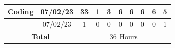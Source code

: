 \documentclass[12pt]{report}
\begin{document}
\begin{table}[h]
{\begin{tabular}{|cc|cccccccc|}
\multicolumn{1}{|c|}{\cellcolor[HTML]{FFFFFF}\textbf{Coding}}                                                    & 07/02/23                                                           & \multicolumn{1}{c|}{\cellcolor[HTML]{FFFFFF}33}                                                                   & \multicolumn{1}{c|}{\cellcolor[HTML]{FFFFFF}1}                                                                 & \multicolumn{1}{c|}{\cellcolor[HTML]{FFFFFF}3}                                                                 & \multicolumn{1}{c|}{\cellcolor[HTML]{FFFFFF}6}                                                                 & \multicolumn{1}{c|}{\cellcolor[HTML]{FFFFFF}6}                                                                 & \multicolumn{1}{c|}{\cellcolor[HTML]{FFFFFF}6}                                                                 & \multicolumn{1}{c|}{\cellcolor[HTML]{FFFFFF}6}                                                                 & \cellcolor[HTML]{FFFFFF}5                                         \\ \hline
\rowcolor[HTML]{FFFFFF} 
\multicolumn{1}{|c|}{\cellcolor[HTML]{FFFFFF}\textbf{Testing}}                                                   & 07/02/23                                                           & \multicolumn{1}{c|}{\cellcolor[HTML]{FFFFFF}1}                                                                    & \multicolumn{1}{c|}{\cellcolor[HTML]{FFFFFF}0}                                                                 & \multicolumn{1}{c|}{\cellcolor[HTML]{FFFFFF}0}                                                                 & \multicolumn{1}{c|}{\cellcolor[HTML]{FFFFFF}0}                                                                 & \multicolumn{1}{c|}{\cellcolor[HTML]{FFFFFF}0}                                                                 & \multicolumn{1}{c|}{\cellcolor[HTML]{FFFFFF}0}                                                                 & \multicolumn{1}{c|}{\cellcolor[HTML]{FFFFFF}0}                                                                 & \cellcolor[HTML]{FFFFFF}1                                         \\ \hline
\multicolumn{2}{|c|}{\textbf{Total}}                                                                                                                                                  & \multicolumn{8}{c|}{36   Hours}                                                                                                                                                                                                                                                                                                                                                                                                                                                                                                                                                                                                                                                                                                                                                                                                                                                             \\ \hline

\end{tabular}}
\end{table}
\end{document}
